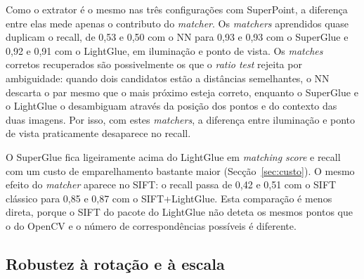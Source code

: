 \documentclass[11pt,a4paper]{article}
\begin{document}
Como o extrator é o mesmo nas três configurações com SuperPoint, a diferença entre elas mede apenas o contributo do \textit{matcher}. Os \textit{matchers} aprendidos quase duplicam o recall, de 0,53 e 0,50 com o NN para 0,93 e 0,93 com o SuperGlue e 0,92 e 0,91 com o LightGlue, em iluminação e ponto de vista. Os \textit{matches} corretos recuperados são possivelmente os que o \textit{ratio test} rejeita por ambiguidade: quando dois candidatos estão a distâncias semelhantes, o NN descarta o par mesmo que o mais próximo esteja correto, enquanto o SuperGlue e o LightGlue o desambiguam através da posição dos pontos e do contexto das duas imagens. Por isso, com estes \textit{matchers}, a diferença entre iluminação e ponto de vista praticamente desaparece no recall.

O SuperGlue fica ligeiramente acima do LightGlue em \textit{matching score} e recall com um custo de emparelhamento bastante maior (Secção~\ref{sec:custo}). O mesmo efeito do \textit{matcher} aparece no SIFT: o recall passa de 0,42 e 0,51 com o SIFT clássico para 0,85 e 0,87 com o SIFT+LightGlue. Esta comparação é menos direta, porque o SIFT do pacote do LightGlue não deteta os mesmos pontos que o do OpenCV e o número de correspondências possíveis é diferente.


\subsection{Robustez à rotação e à escala}
\label{sec:robustez}
\end{document}
